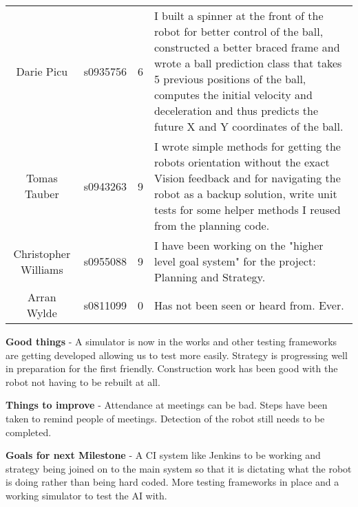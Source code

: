 \documentclass[10pt, a4paper]{article} %
\begin{document}
\begin{longtable}{c c c p{16cm}}
    Darie Picu &
    s0935756 &
    6&
I built a spinner at the front of the robot for better control of the ball,
constructed a better braced frame and wrote a ball prediction class that takes
5 previous positions of the ball, computes the initial velocity and
deceleration and thus predicts the future X and Y coordinates of the ball. 
    \\

    Tomas Tauber &
    s0943263 &
    9&
    I wrote simple methods for getting the robots orientation without the exact
    Vision feedback and for navigating the robot as a backup solution, write
    unit tests for some helper methods I reused from the planning code.\\

    Christopher Williams &
    s0955088 &
    9&
    I have been working on the "higher level goal system" for the project:
    Planning and Strategy.\\

    Arran Wylde &
       s0811099 &
                0&
    Has not been seen or heard from. Ever.\\

\end{longtable}
\textbf{Good things} - A simulator is now in the works and other testing
frameworks are getting developed allowing us to test more easily. Strategy is
progressing well in preparation for the first friendly. Construction work has
been good with the robot not having to be rebuilt at all.

\textbf{Things to improve} - Attendance at meetings can be bad. Steps have been
taken to remind people of meetings. Detection of the robot still needs to be
completed.

\textbf{Goals for next Milestone} - A CI system like Jenkins to be working and
strategy being joined on to the main system so that it is dictating what the
robot is doing rather than being hard coded. More testing frameworks in place
and a working simulator to test the AI with.
\end{document}

